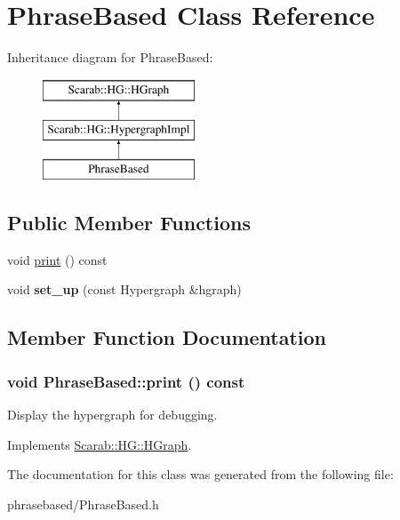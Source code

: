 \hypertarget{class_phrase_based}{
\section{PhraseBased Class Reference}
\label{class_phrase_based}
}
Inheritance diagram for PhraseBased:\begin{figure}[H]
\begin{center}
\leavevmode
\includegraphics[height=3cm]{class_phrase_based}
\end{center}
\end{figure}
\subsection*{Public Member Functions}
\begin{DoxyCompactItemize}
\item 
void \hyperlink{class_phrase_based_aafc2997b58b3698fed7cb5a1f6f269c6}{print} () const 
\item 
\hypertarget{class_phrase_based_a3883660c72be6ce8daab08f368317853}{
void {\bfseries set\_\-up} (const Hypergraph \&hgraph)}
\label{class_phrase_based_a3883660c72be6ce8daab08f368317853}

\end{DoxyCompactItemize}


\subsection{Member Function Documentation}
\hypertarget{class_phrase_based_aafc2997b58b3698fed7cb5a1f6f269c6}{
\subsubsection[{print}]{\setlength{\rightskip}{0pt plus 5cm}void PhraseBased::print () const}}
\label{class_phrase_based_aafc2997b58b3698fed7cb5a1f6f269c6}
Display the hypergraph for debugging. 

Implements \hyperlink{class_scarab_1_1_h_g_1_1_h_graph_ab5aa11c932b28864b56f28e0babbc1c1}{Scarab::HG::HGraph}.



The documentation for this class was generated from the following file:\begin{DoxyCompactItemize}
\item 
phrasebased/PhraseBased.h\end{DoxyCompactItemize}
